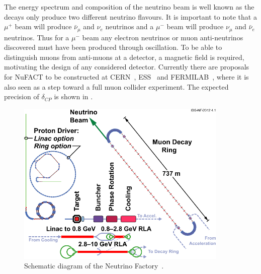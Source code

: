 The energy spectrum and composition of the neutrino beam is well known as the decays only produce two different neutrino flavours. It is important to note that a $\mu^+$ beam will produce $\bar{\nu}_\mu$ and $\nu_e$ neutrinos and a $\mu^-$ beam will produce $\nu_\mu$ and $\bar{\nu}_e$ neutrinos. Thus for a $\mu^-$ beam any electron neutrinos or muon anti-neutrinos discovered must have been produced through oscillation. To be able to distinguish muons from anti-muons at a detector, a magnetic field is required, motivating the design of any considered detector. Currently there are proposals for NuFACT to be constructed at CERN~\cite{25NUfact}, ESS~\cite{ESS} and FERMILAB~\cite{NuFACTfermi}, where it is also seen as a step toward a full muon collider experiment. The expected precision of $\delta_{CP}$ is shown in .

\begin{figure}[h!]
\centering
\includegraphics[width=0.9\textwidth]{figures/131112-IDS-NF.pdf}
\caption{Schematic diagram of the Neutrino Factory~\cite{Fix7}.}
\label{fig:nuFact}
\end{figure}

